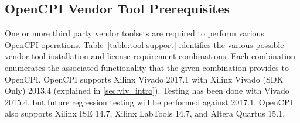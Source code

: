\begin{flushleft}
\begin{landscape}
\section{OpenCPI Vendor Tool Prerequisites}
\label{sec:doc_overview}
One or more third party vendor toolsets are required to perform various OpenCPI operations. Table~\ref{table:tool-support} identifies the various possible vendor tool installation and license requirement combinations. Each combination enumerates the associated functionality that the given combination provides to OpenCPI. OpenCPI supports Xilinx Vivado 2017.1 with Xilinx Vivado (SDK Only) 2013.4 (explained in \ref{sec:viv_intro}). Testing has been done with Vivado 2015.4, but future regression testing will be performed against 2017.1. OpenCPI also supports Xilinx ISE 14.7, Xilinx LabTools 14.7, and Altera Quartus 15.1.


\end{landscape}
\end{flushleft}
